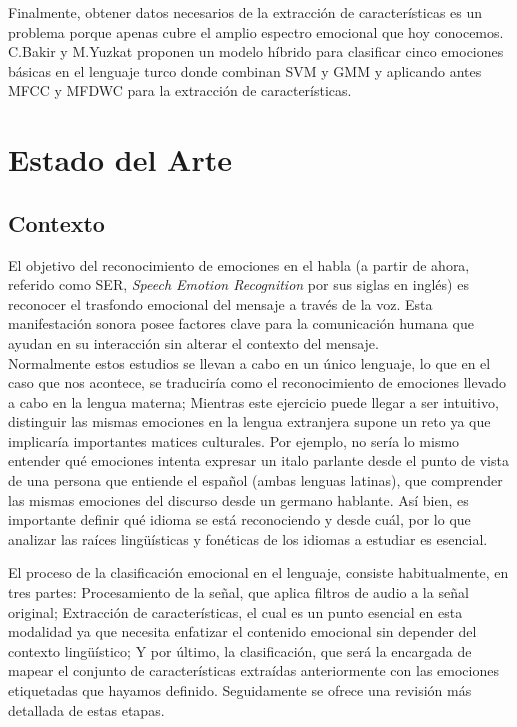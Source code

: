 \documentclass[11pt,a4paper,spanish]{book}
\begin{document}
	Finalmente, obtener datos necesarios de la extracción de características es un problema porque apenas cubre el amplio espectro emocional que hoy conocemos. C.Bakir y M.Yuzkat \cite{BAKIR2018} proponen un modelo híbrido para clasificar cinco emociones básicas en el lenguaje turco donde combinan SVM y GMM y aplicando antes MFCC y MFDWC para la extracción de características.
	
	
	
	
	\chapter{Estado del Arte}
	\section{Contexto}
	El objetivo del reconocimiento de emociones en el habla (a partir de ahora, referido como  SER, \emph{Speech Emotion Recognition} por sus siglas en inglés) es reconocer el trasfondo emocional del mensaje a través de la voz. Esta manifestación sonora posee factores clave para la comunicación humana que ayudan en su interacción sin alterar el contexto del mensaje.\\
	Normalmente estos estudios se llevan a cabo en un único lenguaje, lo que en el caso que nos acontece, se traduciría como el reconocimiento de emociones llevado a cabo en la lengua materna; Mientras este ejercicio puede llegar a ser intuitivo, distinguir las mismas emociones en la lengua extranjera supone un reto ya que implicaría importantes matices culturales. Por ejemplo, no sería lo mismo entender qué emociones intenta expresar un italo parlante desde el punto de vista de una persona que entiende el español (ambas lenguas latinas), que comprender las mismas emociones del discurso desde un germano hablante. Así bien, es importante definir qué idioma se está reconociendo y desde cuál, por lo que analizar las raíces lingüísticas y fonéticas de los idiomas a estudiar es esencial. 
	
	El proceso de la clasificación emocional en el lenguaje, consiste habitualmente, en tres partes: Procesamiento de la señal, que aplica filtros de audio a la señal original; Extracción de características, el cual es un punto esencial en esta modalidad ya que necesita enfatizar el contenido emocional sin depender del contexto lingüístico; Y por último, la clasificación, que será la encargada de mapear el conjunto de características extraídas anteriormente con las emociones etiquetadas que hayamos definido. Seguidamente se ofrece una revisión más detallada de estas etapas.
	
\end{document}
